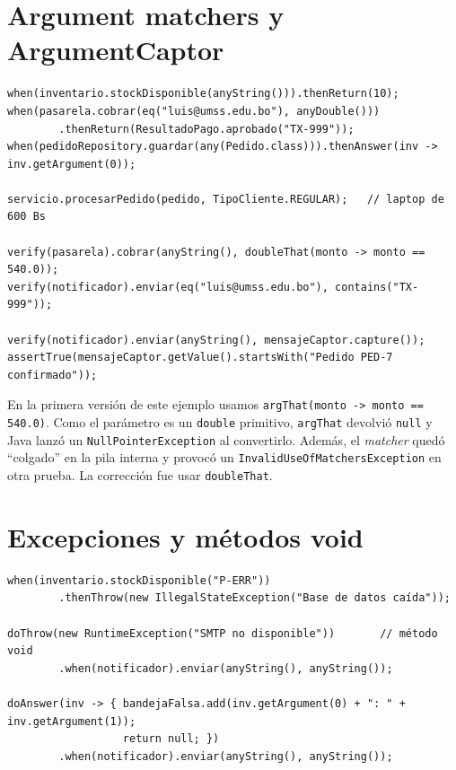 \documentclass[11pt,a4paper,oneside]{report}
\newcommand{\code}[1]{\texttt{#1}}
\begin{document}
\section{Argument matchers y ArgumentCaptor}
\label{sec:matchers}
\begin{lstlisting}[caption={\code{E03\_ArgumentMatchersYCaptorTest} (extracto)}]
when(inventario.stockDisponible(anyString())).thenReturn(10);
when(pasarela.cobrar(eq("luis@umss.edu.bo"), anyDouble()))
        .thenReturn(ResultadoPago.aprobado("TX-999"));
when(pedidoRepository.guardar(any(Pedido.class))).thenAnswer(inv -> inv.getArgument(0));

servicio.procesarPedido(pedido, TipoCliente.REGULAR);   // laptop de 600 Bs

verify(pasarela).cobrar(anyString(), doubleThat(monto -> monto == 540.0));
verify(notificador).enviar(eq("luis@umss.edu.bo"), contains("TX-999"));

verify(notificador).enviar(anyString(), mensajeCaptor.capture());
assertTrue(mensajeCaptor.getValue().startsWith("Pedido PED-7 confirmado"));
\end{lstlisting}

\begin{nota}
En la primera versión de este ejemplo usamos \code{argThat(monto -> monto == 540.0)}. Como el parámetro es un \code{double} primitivo, \code{argThat} devolvió \code{null} y Java lanzó un \code{NullPointerException} al convertirlo. Además, el \emph{matcher} quedó ``colgado'' en la pila interna y provocó un \code{InvalidUseOfMatchersException} en otra prueba. La corrección fue usar \code{doubleThat}.
\end{nota}

\section{Excepciones y métodos void}
\begin{lstlisting}[caption={\code{E04\_ExcepcionesYVoidTest} (extracto)}]
when(inventario.stockDisponible("P-ERR"))
        .thenThrow(new IllegalStateException("Base de datos caída"));

doThrow(new RuntimeException("SMTP no disponible"))       // método void
        .when(notificador).enviar(anyString(), anyString());

doAnswer(inv -> { bandejaFalsa.add(inv.getArgument(0) + ": " + inv.getArgument(1));
                  return null; })
        .when(notificador).enviar(anyString(), anyString());
\end{lstlisting}
\end{document}
